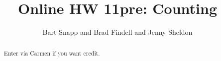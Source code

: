 \documentclass[handout,space,nooutcomes]{xourse}
\title{Online HW 11pre: Counting}
\author{Bart Snapp and Brad Findell and Jenny Sheldon}
\begin{document}
\begin{abstract}
Enter via Carmen if you want credit.   
\end{abstract}
\maketitle


\end{document}
